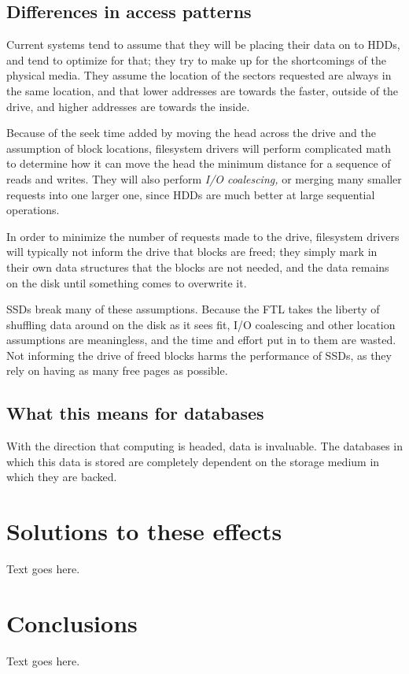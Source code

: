 \documentclass[format=acmsmall, review=false, screen=true]{acmart}
\begin{document}
\subsection{Differences in access patterns}

Current systems tend to assume that they will be placing their data on to HDDs, and tend to optimize for that; they try 
to make up for the shortcomings of the physical media. They assume the location of the sectors requested are always in 
the same location, and that lower addresses are towards the faster, outside of the drive, and higher addresses are towards 
the inside. \cite{Cornwell2012}

Because of the seek time added by moving the head across the drive and the assumption of block locations, filesystem drivers 
will perform complicated math to determine how it can move the head the minimum distance for a sequence of reads and writes. 
They will also perform \textit{I/O coalescing,} or merging many smaller requests into one larger one, since HDDs are much 
better at large sequential operations. \cite{Cornwell2012}

In order to minimize the number of requests made to the drive, filesystem drivers will typically not inform the drive that 
blocks are freed; they simply mark in their own data structures that the blocks are not needed, and the data remains on 
the disk until something comes to overwrite it. \cite{Cornwell2012}

SSDs break many of these assumptions. Because the FTL takes the liberty of shuffling data around on the disk as it sees 
fit, I/O coalescing and other location assumptions are meaningless, and the time and effort put in to them are wasted. 
Not informing the drive of freed blocks harms the performance of SSDs, as they rely on having as many free pages as 
possible. \cite{Cornwell2012, Micheloni2013, MatejFucek2014}

\subsection{What this means for databases}

With the direction that computing is headed, data is invaluable. The databases in which this data is stored are completely 
dependent on the storage medium in which they are backed. 

\section{Solutions to these effects}

Text goes here.

\section{Conclusions}

Text goes here.



\end{document}
